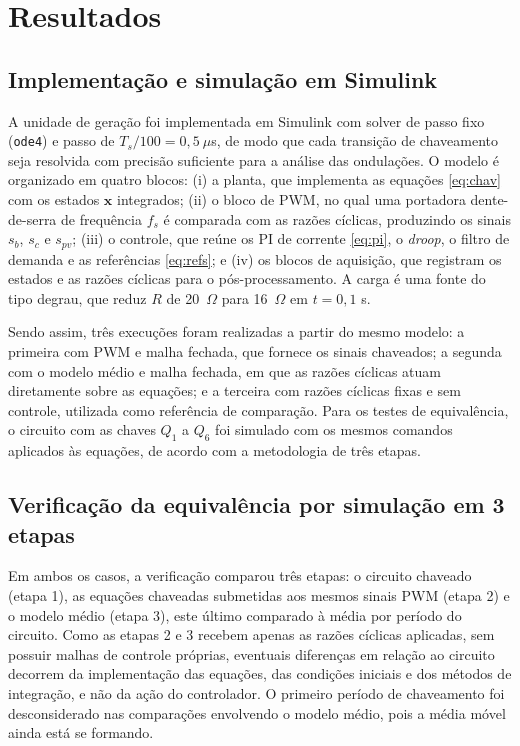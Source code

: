 \section{Resultados}

\subsection{Implementação e simulação em Simulink}

A unidade de geração foi implementada em Simulink com solver de passo fixo (\texttt{ode4}) e passo de $T_s/100=0{,}5\ \mu$s, de modo que cada transição de chaveamento seja resolvida com precisão suficiente para a análise das ondulações. O modelo é organizado em quatro blocos: (i) a planta, que implementa as equações \eqref{eq:chav} com os estados $\mathbf{x}$ integrados; (ii) o bloco de PWM, no qual uma portadora dente-de-serra de frequência $f_s$ é comparada com as razões cíclicas, produzindo os sinais $s_b$, $s_c$ e $s_{pv}$; (iii) o controle, que reúne os PI de corrente \eqref{eq:pi}, o \textit{droop}, o filtro de demanda e as referências \eqref{eq:refs}; e (iv) os blocos de aquisição, que registram os estados e as razões cíclicas para o pós-processamento. A carga é uma fonte do tipo degrau, que reduz $R$ de 20~$\Omega$ para 16~$\Omega$ em $t=0{,}1$ s.

Sendo assim, três execuções foram realizadas a partir do mesmo modelo: a primeira com PWM e malha fechada, que fornece os sinais chaveados; a segunda com o modelo médio e malha fechada, em que as razões cíclicas atuam diretamente sobre as equações; e a terceira com razões cíclicas fixas e sem controle, utilizada como referência de comparação. Para os testes de equivalência, o circuito com as chaves $Q_1$ a $Q_6$ foi simulado com os mesmos comandos aplicados às equações, de acordo com a metodologia de três etapas.

\subsection{Verificação da equivalência por simulação em 3 etapas}

Em ambos os casos, a verificação comparou três etapas: o circuito chaveado (etapa 1), as equações chaveadas submetidas aos mesmos sinais PWM (etapa 2) e o modelo médio (etapa 3), este último comparado à média por período do circuito. Como as etapas 2 e 3 recebem apenas as razões cíclicas aplicadas, sem possuir malhas de controle próprias, eventuais diferenças em relação ao circuito decorrem da implementação das equações, das condições iniciais e dos métodos de integração, e não da ação do controlador. O primeiro período de chaveamento foi desconsiderado nas comparações envolvendo o modelo médio, pois a média móvel ainda está se formando.

